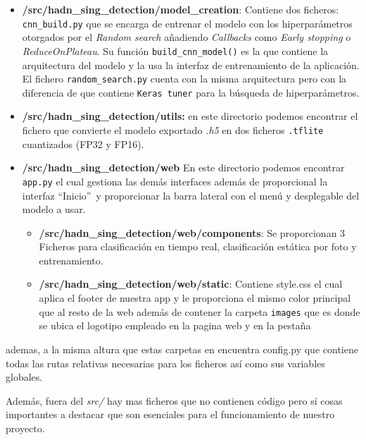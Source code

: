 \begin{itemize}
    \item  \textbf{/src/hadn\_sing\_detection/model\_creation}: Contiene dos ficheros: \texttt{cnn\_build.py} que se encarga de entrenar el modelo con los hiperparámetros otorgados por el \textit{Random search} añadiendo \textit{Callbacks} como \textit{Early stopping} o \textit{ReduceOnPlateau}. Su función \texttt{build\_cnn\_model()} es la que contiene la arquitectura del modelo y la usa la interfaz de entrenamiento de la aplicación. El fichero \texttt{random\_search.py} cuenta con la misma arquitectura pero con la diferencia de que contiene \texttt{Keras tuner} para la búsqueda de hiperparámetros.
    \item \textbf{/src/hadn\_sing\_detection/utils:} en este directorio podemos encontrar el fichero que convierte el modelo exportado \textit{.h5} en dos ficheros \texttt{.tflite} cuantizados (FP32 y FP16).
    \item \textbf{/src/hadn\_sing\_detection/web}
    En este directorio podemos encontrar \texttt{app.py} el cual gestiona las demás interfaces además de proporcional la interfaz ``Inicio''\ y proporcionar la barra lateral con el menú y desplegable del modelo a usar.
        \begin{itemize}
            \item \textbf{/src/hadn\_sing\_detection/web/components}: Se proporcionan 3 Ficheros para clasificación en tiempo real, clasificación estática por foto y entrenamiento. 
            \item \textbf{/src/hadn\_sing\_detection/web/static}: Contiene style.css el cual aplica el footer de nuestra app y le proporciona el mismo color principal que al resto de la web además de contener la carpeta \texttt{images} que es donde se ubica el logotipo empleado en la pagina web y en la pestaña
        \end{itemize}
\end{itemize}
ademas, a la misma altura que estas carpetas en encuentra config.py que contiene todas las rutas relativas necesarias para los ficheros así como sus variables globales.

Además, fuera del \textit{src/} hay mas ficheros que no contienen código pero sí cosas importantes a destacar que son esenciales para el funcionamiento de nuestro proyecto.

